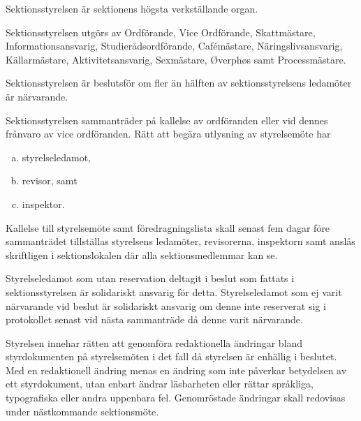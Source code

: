 \documentclass[stadgar]{dsekprotokoll}
\begin{document}
\begin{stadgeavsnitt}


Sektionsstyrelsen är sektionens högsta verkställande organ.


Sektionsstyrelsen utgörs av Ordförande, Vice Ordförande, Skattmästare, Informationsansvarig, Studierådsordförande, Cafémästare, Näringslivsansvarig, Källarmästare, Aktivitetsansvarig, Sexmästare, Øverphøs samt Processmästare.


Sektionsstyrelsen är beslutsför om fler än hälften av sektionsstyrelsens
ledamöter är närvarande.


Sektionsstyrelsen sammanträder på kallelse av ordföranden eller vid dennes
frånvaro av vice ordföranden. Rätt att begära utlysning av styrelsemöte
har
\begin{enumerate}[a)]
\item styrelseledamot,
\item revisor, samt
\item inspektor.
\end{enumerate}


Kallelse till styrelsemöte samt föredragningslista skall senast fem dagar före sammanträdet tillställas styrelsens ledamöter,
revisorerna, inspektorn samt anslås skriftligen i sektionslokalen där alla sektionsmedlemmar kan se.


Styrelseledamot som utan reservation
deltagit i beslut som fattats i sektionsstyrelsen är solidariskt ansvarig för detta. 
Styrelseledamot som ej varit närvarande vid beslut är solidariskt ansvarig om denne inte reserverat
sig i protokollet senast vid nästa sammanträde då denne varit närvarande.


Styrelsen innehar rätten att genomföra redaktionella ändringar bland styrdokumenten på styrelsemöten i 
det fall då styrelsen är enhällig i beslutet. Med en redaktionell ändring menas en ändring som inte påverkar 
betydelsen av ett styrdokument, utan enbart ändrar läsbarheten eller rättar språkliga, typografiska eller 
andra uppenbara fel. Genomröstade ändringar skall redovisas under nästkommande sektionsmöte.

\end{stadgeavsnitt}
\end{document}
